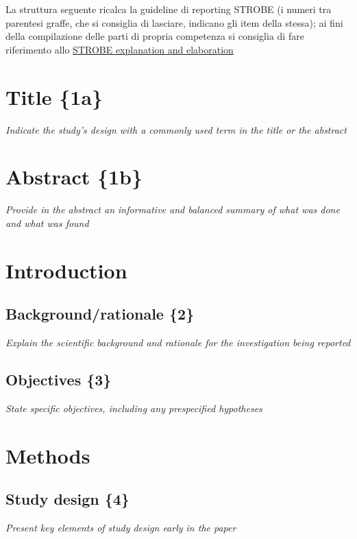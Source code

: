 
La struttura seguente ricalca la guideline di reporting STROBE (i
numeri tra parentesi graffe, che si consiglia di lasciare, indicano
gli item della stessa); ai fini della compilazione delle parti di
propria competenza si consiglia di fare riferimento allo
\href{https://www.ncbi.nlm.nih.gov/pmc/articles/pmid/17941715/}{STROBE
  explanation and elaboration}

\section{Title \{1a\}}

{\em Indicate the study's design with a commonly used term in the title or
the abstract}

\section{Abstract \{1b\}}

{\em Provide in the abstract an informative and balanced summary of what
was done and what was found}

\section{Introduction}

\subsection{Background/rationale \{2\}}

{\em Explain the scientific background and rationale for the investigation
being reported}

\subsection{Objectives \{3\}}

{\em State specific objectives, including any prespecified hypotheses}

\section{Methods}

\subsection{Study design \{4\}}

{\em Present key elements of study design early in the paper}

